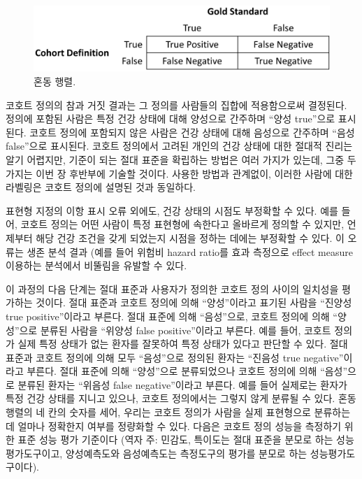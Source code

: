\documentclass[10.5pt]{book}
\theoremstyle{definition}
\theoremstyle{definition}
\theoremstyle{definition}
\theoremstyle{remark}
\begin{document}
\begin{figure}

{\centering \includegraphics[width=0.75\linewidth]{images/ClinicalValidity/matrix} 

}

\caption{혼동 행렬.}\label{fig:matrix}
\end{figure}

코호트 정의의 참과 거짓 결과는 그 정의를 사람들의 집합에 적용함으로써
결정된다. 정의에 포함된 사람은 특정 건강 상태에 대해 양성으로 간주하며
``양성 true''으로 표시된다. 코호트 정의에 포함되지 않은 사람은 건강
상태에 대해 음성으로 간주하며 ``음성 false''으로 표시된다. 코호트
정의에서 고려된 개인의 건강 상태에 대한 절대적 진리는 알기 어렵지만,
기준이 되는 절대 표준을 확립하는 방법은 여러 가지가 있는데, 그중 두
가지는 이번 장 후반부에 기술할 것이다. 사용한 방법과 관계없이, 이러한
사람에 대한 라벨링은 코호트 정의에 설명된 것과 동일하다.

표현형 지정의 이항 표시 오류 외에도, 건강 상태의 시점도 부정확할 수
있다. 예를 들어, 코호트 정의는 어떤 사람이 특정 표현형에 속한다고
올바르게 정의할 수 있지만, 언제부터 해당 건강 조건을 갖게 되었는지
시점을 정하는 데에는 부정확할 수 있다. 이 오류는 생존 분석 결과 (예를
들어 위험비 hazard ratio를 효과 측정으로 effect measure 이용하는
분석에서 비뚤림을 유발할 수 있다.

이 과정의 다음 단계는 절대 표준과 사용자가 정의한 코호트 정의 사이의
일치성을 평가하는 것이다. 절대 표준과 코호트 정의에 의해 ``양성''이라고
표기된 사람을 ``진양성 true positive''이라고 부른다. 절대 표준에 의해
``음성''으로, 코호트 정의에 의해 ``양성''으로 분류된 사람을 ``위양성
false positive''이라고 부른다. 예를 들어, 코호트 정의가 실제 특정 상태가
없는 환자를 잘못하여 특정 상태가 있다고 판단할 수 있다. 절대 표준과
코호트 정의에 의해 모두 ``음성''으로 정의된 환자는 ``진음성 true
negative''이라고 부른다. 절대 표준에 의해 ``양성''으로 분류되었으나
코호트 정의에 의해 ``음성''으로 분류된 환자는 ``위음성 false
negative''이라고 부른다. 예를 들어 실제로는 환자가 특정 건강 상태를
지니고 있으나, 코호트 정의에서는 그렇지 않게 분류될 수 있다. 혼동 행렬의
네 칸의 숫자를 세어, 우리는 코호트 정의가 사람을 실제 표현형으로
분류하는 데 얼마나 정확한지 여부를 정량화할 수 있다. 다음은 코호트 정의
성능을 측정하기 위한 표준 성능 평가 기준이다 (역자 주: 민감도, 특이도는
절대 표준을 분모로 하는 성능평가도구이고, 양성예측도와 음성예측도는
측정도구의 평가를 분모로 하는 성능평가도구이다).
\end{document}
